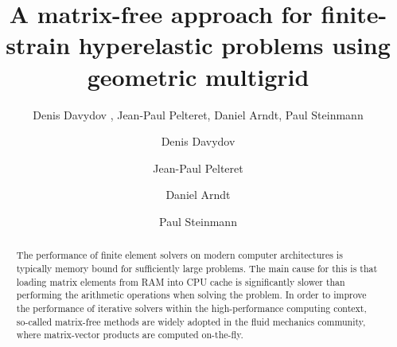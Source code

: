 \documentclass[times,doublespace]{nmeauth}
\newcommand{\changeDD}[1]{#1}
\begin{document}
\ifijnme
{}
\else
{}
\begin{frontmatter}
\fi

\title{
  A matrix-free approach for finite-strain hyperelastic problems using geometric multigrid
  }

\ifijnme
  \author{
    Denis Davydov \corrauth ,
    Jean-Paul Pelteret,
    Daniel Arndt,
    Paul Steinmann
  }

  \address{
    Chair of Applied Mechanics,
    Friedrich-Alexander-Universit\"{a}t Erlangen-N\"{u}rnberg,
    Egerlandstr.\ 5, 91058 Erlangen, Germany \break
    Interdisciplinary Center for Scientific Computing (IWR),
    Heidelberg University,
    Im Neuenheimer Feld 205, 69120 Heidelberg, Germany \break
    Glasgow Computational Engineering Center (GCEC),
        University of Glasgow, G12 8QQ Glasgow, United Kingdom \break
    }


\else
  \author[a]{Denis Davydov}

  \author[a]{Jean-Paul Pelteret}

  \author[b]{Daniel Arndt}

  \author[a,c]{Paul Steinmann}


  \address[a]{Chair of Applied Mechanics,
  Friedrich-Alexander-Universit\"{a}t Erlangen-N\"{u}rnberg,
  Egerlandstr.\ 5, 91058 Erlangen, Germany}

  \address[b]{Interdisciplinary Center for Scientific Computing (IWR),
      Heidelberg University,
      Im Neuenheimer Feld 205,
      69120 Heidelberg,
      Germany}

  \address[c]{Glasgow Computational Engineering Center (GCEC),
      University of Glasgow, G12 8QQ Glasgow, United Kingdom
  }
\fi


  \begin{abstract}
    The performance of finite element solvers on modern computer architectures is typically memory bound \changeDD{ for sufficiently large problems}.
    The main cause for this is that loading matrix elements from RAM into CPU cache is significantly slower than performing the arithmetic operations when solving the problem.
    In order to improve the performance of iterative solvers within the high-performance computing context, so-called matrix-free methods are
    widely adopted in the fluid mechanics community, where matrix-vector products are computed on-the-fly.


\end{abstract}
\end{frontmatter}
\end{document}
